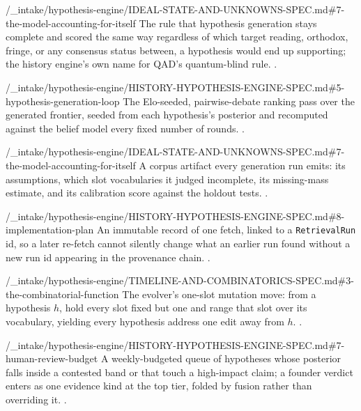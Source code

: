 %
  {\bktrepo/_intake/hypothesis-engine/IDEAL-STATE-AND-UNKNOWNS-SPEC.md\#7-the-model-accounting-for-itself}%
  {The rule that hypothesis generation stays complete and scored the same
   way regardless of which target reading, orthodox, fringe, or any
   consensus status between, a hypothesis would end up supporting; the
   history engine's own name for QAD's quantum-blind rule.
   .}

%
  {\bktrepo/_intake/hypothesis-engine/HISTORY-HYPOTHESIS-ENGINE-SPEC.md\#5-hypothesis-generation-loop}%
  {The Elo-seeded, pairwise-debate ranking pass over the generated
   frontier, seeded from each hypothesis's posterior and recomputed against
   the belief model every fixed number of rounds. .}

%
  {\bktrepo/_intake/hypothesis-engine/IDEAL-STATE-AND-UNKNOWNS-SPEC.md\#7-the-model-accounting-for-itself}%
  {A corpus artifact every generation run emits: its assumptions, which
   slot vocabularies it judged incomplete, its missing-mass estimate, and
   its calibration score against the holdout tests.
   .}

%
  {\bktrepo/_intake/hypothesis-engine/HISTORY-HYPOTHESIS-ENGINE-SPEC.md\#8-implementation-plan}%
  {An immutable record of one fetch, linked to a \texttt{RetrievalRun} id,
   so a later re-fetch cannot silently change what an earlier run found
   without a new run id appearing in the provenance chain.
   .}

%
  {\bktrepo/_intake/hypothesis-engine/TIMELINE-AND-COMBINATORICS-SPEC.md\#3-the-combinatorial-function}%
  {The evolver's one-slot mutation move: from a hypothesis $h$, hold every
   slot fixed but one and range that slot over its vocabulary, yielding
   every hypothesis address one edit away from $h$. .}

%
  {\bktrepo/_intake/hypothesis-engine/HISTORY-HYPOTHESIS-ENGINE-SPEC.md\#7-human-review-budget}%
  {A weekly-budgeted queue of hypotheses whose posterior falls inside a
   contested band or that touch a high-impact claim; a founder verdict
   enters as one evidence kind at the top tier, folded by fusion rather
   than overriding it. .}
